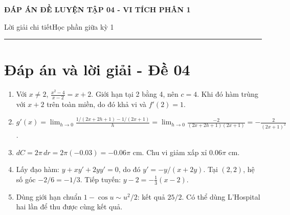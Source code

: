 \documentclass[11pt,a4paper]{article}
\newcommand{\examtitle}[4]{\begin{center}{\Large\bfseries\color{hcmusblue}#1}\par\vspace{3pt}{\large\bfseries #2}\par\vspace{3pt}\small #3\quad\textbullet\quad #4\end{center}\vspace{5pt}\hrule\vspace{8pt}}
\begin{document}
\examtitle{ĐÁP ÁN ĐỀ LUYỆN TẬP 04 - VI TÍCH PHÂN 1}{VI TÍCH PHÂN 1 - HCMUS (bộ luyện tập)}{Lời giải chi tiết}{Học phần giữa kỳ 1}

\section*{Đáp án và lời giải - Đề 04}
\begin{enumerate}
\item Với $x\ne2$, $\frac{x^2-4}{x-2}=x+2$. Giới hạn tại 2 bằng 4, nên $c=4$. Khi đó hàm trùng với $x+2$ trên toàn miền, do đó khả vi và $f'(2)=1$.
\item $g'(x)=\lim_{h\to0}\frac{1/(2x+2h+1)-1/(2x+1)}h=\lim_{h\to0}\frac{-2}{(2x+2h+1)(2x+1)}=-\frac2{(2x+1)^2}$.
\item $dC=2\pi\,dr=2\pi(-0.03)=-0.06\pi$ cm. Chu vi giảm xấp xỉ $0.06\pi$ cm.
\item Lấy đạo hàm: $y+xy'+2yy'=0$, do đó $y'=-y/(x+2y)$. Tại $(2,2)$, hệ số góc $-2/6=-1/3$. Tiếp tuyến: $y-2=-\frac13(x-2)$.
\item Dùng giới hạn chuẩn $1-\cos u\sim u^2/2$: kết quả $25/2$. Có thể dùng L'Hospital hai lần để thu được cùng kết quả.
\end{enumerate}
\end{document}

